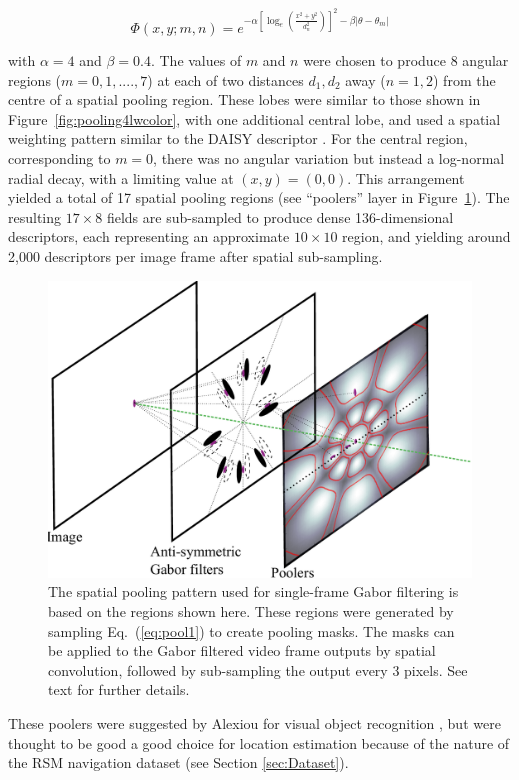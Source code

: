 \begin{equation}
\Phi(x,y;m,n) = e^{-\alpha \left [\log_e \left ( \frac{x^2+y^2}{d_n^2}\right ) \right ]^2 - \beta |\theta-\theta_m | }
\label{eq:pool1}
\end{equation}

\noindent with $\alpha = 4$ and $\beta = 0.4$. The values of $m$ and $n$ were chosen to produce 8 angular regions ($m = 0, 1, ...., 7$) at each of two distances $d_1, d_2$ away ($n=1,2$) from the centre of a spatial pooling region. These lobes were similar to those shown in Figure~\ref{fig:pooling4lwcolor}, with one additional central lobe, and used a spatial weighting pattern similar to the DAISY descriptor \cite{Winder2009}. For the central region, corresponding to $m=0$, there was no angular variation but instead a log-normal radial decay, with a limiting value at $(x,y)=(0,0)$. This arrangement yielded a total of  17 spatial pooling regions (see ``poolers'' layer in Figure~\ref{fig:IsoPool}). The resulting $17 \times 8$ fields are sub-sampled to produce dense 136-dimensional descriptors, each representing an approximate $10 \times 10$ region, and yielding around 2,000 descriptors per image frame after spatial sub-sampling. 

\begin{figure}[t]
\centering
\includegraphics[width=0.7\linewidth]{./gfx/Chapter04/Layers.pdf}
\caption{The spatial pooling pattern used for single-frame Gabor filtering is based on the regions shown here.  These regions were generated by sampling Eq.~(\ref{eq:pool1}) to create pooling masks. The masks can be applied to the Gabor filtered video frame outputs by spatial convolution, followed by sub-sampling the output every 3 pixels. See text for further details.}
\label{fig:IsoPool}
\end{figure}

These poolers were suggested by Alexiou for visual object recognition \cite{Alexiou2013}, but were thought to be good a good choice for location estimation because of the nature of the RSM navigation dataset (see Section \ref{sec:Dataset}).

